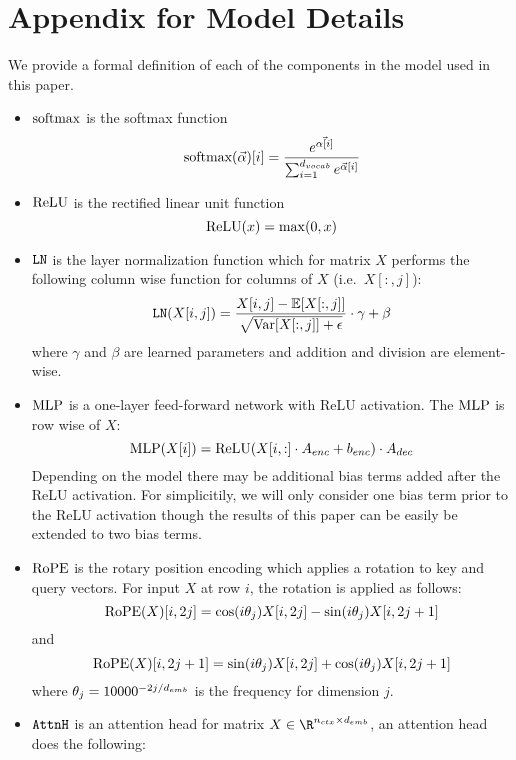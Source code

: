 \section{Appendix for Model Details}
\label{sec:appendix_model}
We provide a formal definition of each of the components in the model used in this paper.
\begin{itemize}
	\item $\text{softmax}$ is the softmax function
		\[
			\text{softmax}(\vec{\alpha})[i] = \frac{e^{\vec{\alpha[i]}}}{\sum_{i=1}^{{d_{vocab}}} e^{\vec{\alpha}[i]}}
		\]
	\item $\text{ReLU}$ is the rectified linear unit function
		\[
			\text{ReLU}(x) = \max(0, x)
		\]
	\item $\texttt{LN}$ is the layer normalization function which for matrix $X$ performs the following column wise function for columns of $X$ (i.e.\ $X[:, j]$):
		\[
			\texttt{LN}(X[i, j]) = \frac{X[i, j] - \mathbb{E}[X[:, j]]}{\sqrt{\mathrm{Var}[X[:, j]] + \epsilon} } \cdot \gamma + \beta
		\]
		where $\gamma$ and $\beta$ are learned parameters and addition and division are element-wise.
	\item $\text{MLP}$ is a one-layer feed-forward network with ReLU activation. The $\text{MLP}$ is row wise of $X$:
		\[
			\text{MLP}(X[i]) = \text{ReLU}(X[i, :] \cdot A_{enc} + b_{enc}) \cdot A_{dec}
		\]
		Depending on the model there may be additional bias terms added after the ReLU activation.
		For simplicitily, we will only consider one bias term prior to the ReLU activation though the results of this paper can be easily be extended to two bias terms.
	\item $\operatorname{RoPE}$ \cite{su2024roformer} is the rotary position encoding which applies a rotation to key and query vectors. For input $X$ at row $i$, the rotation is applied as follows: 
		\[
			\operatorname{RoPE}(X)[i, 2j] = \cos(i\theta_j)X[i, {2j}] - \sin(i\theta_j)X[i, 2j + 1]
		\]
		and
		\[
			\operatorname{RoPE}(X)[i, 2j + 1] = \sin(i\theta_j)X[i, {2j}] + \cos(i\theta_j)X[i, 2j + 1]
		\]
		where $\theta_j = 10000^{-2j/{d_{emb}}}$ is the frequency for dimension $j$.
	\item $\texttt{AttnH}$ is an attention head for matrix $X \in \R^{\nctx \times \dEmb}$, an attention head does the following:
		\[
\]
\end{itemize}
